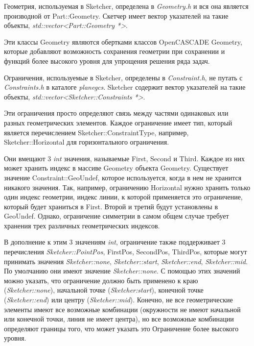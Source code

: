 \documentclass[12pt,twoside,a4paper]{book}
\newenvironment{tolerant}[1]{%
  \par\tolerance=#1\relax
}{%
  \par
}
\begin{document}
    \begin{tolerant}{500}
    Геометрия, используемая в Sketcher, определена в \emph{Geometry.h} и вся она является производной от Part::Geometry. Скетчер имеет вектор указателей на такие объекты, \emph{std::vector\textless Part::Geometry *\textgreater}.

    Эти классы Geometry являются обертками классов OpenCASCADE Geometry, которые добавляют возможность сохранения геометрии при сохранении и функций более высокого уровня для упрощения решения ряда задач.

    Ограничения, используемые в Sketcher, определены в \emph{Constraint.h}, не путать с \emph{Constraints.h} в каталоге \emph{planegcs}. Sketcher содержит вектор указателей на такие объекты, \emph{std::vector\textless Sketcher::Constraints *\textgreater}.

    Эти ограничения просто определяют связь между частями одинаковых или разных геометрических элементов. Каждое ограничение имеет тип, который является перечислением Sketcher::ConstraintType, например, Sketcher::Horizontal для горизонтального ограничения.

    Они вмещают 3 \emph{int} значения, называемые First, Second и Third. Каждое из них может хранить индекс в массиве Geometry объекта Geometry. Существует значение Constraint::GeoUndef, которое используется, когда в нем не хранится никакого значения. Так, например, ограничению Horizontal нужно хранить только один индекс геометрии, индекс линии, к которой применяется это ограничение, который будет храниться в First. Второй и третий будут установлены в GeoUndef. Однако, ограничение симметрии в самом общем случае требует хранения трех различных геометрических индексов.

    В дополнение к этим 3 значениям \emph{int}, ограничение также поддерживает 3 перечисления \emph{Sketcher::PointPos}, FirstPos, SecondPos, ThirdPos, которые могут принимать значения \emph{Sketcher::none}, \emph{Sketcher::start}, \emph{Sketcher::end}, \emph{Sketcher::mid}. По умолчанию они имеют значение \emph{Sketcher::none}. С помощью этих значений можно указать, что ограничение должно быть применено к краю (\emph{Sketcher::none}), начальной точке (\emph{Sketcher:start}), конечной точке (\emph{Sketcher::end}) или центру (\emph{Sketcher::mid}). Конечно, не все геометрические элементы имеют все возможные комбинации (окружности не имеют начальной или конечной точки, линия не имеет центра), но все возможные комбинации определяют границы того, что может указать это Ограничение более высокого уровня.


\end{tolerant}
\end{document}
